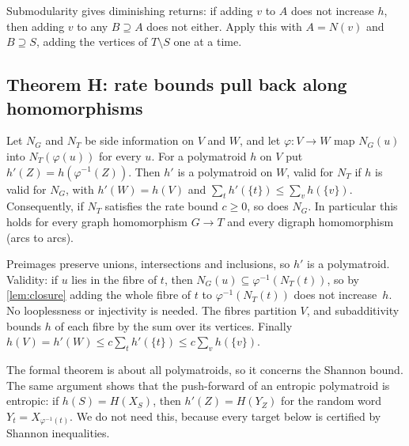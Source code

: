 \begin{outline}
Submodularity gives diminishing returns: if adding $v$ to $A$ does not increase $h$, then adding $v$ to any $B\supseteq A$
does not either. Apply this with $A=N(v)$ and $B\supseteq S$, adding the vertices of $T\setminus S$ one at a time.
\end{outline}

\subsection{Theorem H: rate bounds pull back along homomorphisms}\label{sec:thmH}

\begin{theorem}[Theorem H]\label{thm:H}
Let $N_G$ and $N_T$ be side information on $V$ and $W$, and let $\varphi\colon V\to W$ map $N_G(u)$ into $N_T(\varphi(u))$
for every $u$. For a polymatroid $h$ on $V$ put $h'(Z)=h(\varphi^{-1}(Z))$. Then $h'$ is a polymatroid on $W$, valid for
$N_T$ if $h$ is valid for $N_G$, with $h'(W)=h(V)$ and $\sum_th'(\{t\})\le\sum_vh(\{v\})$. Consequently, if $N_T$ satisfies
the rate bound $c\ge0$, so does $N_G$. In particular this holds for every graph homomorphism $G\to T$ and every digraph
homomorphism (arcs to arcs).
\end{theorem}

\begin{outline}
Preimages preserve unions, intersections and inclusions, so $h'$ is a polymatroid. Validity: if $u$ lies in the fibre of
$t$, then $N_G(u)\subseteq\varphi^{-1}(N_T(t))$, so by \cref{lem:closure} adding the whole fibre of $t$ to
$\varphi^{-1}(N_T(t))$ does not increase~$h$. No looplessness or injectivity is needed. The fibres partition $V$, and
subadditivity bounds $h$ of each fibre by the sum over its vertices. Finally
$h(V)=h'(W)\le c\sum_th'(\{t\})\le c\sum_vh(\{v\})$.
\end{outline}

The formal theorem is about all polymatroids, so it concerns the Shannon bound. The same argument shows that the
push-forward of an entropic polymatroid is entropic: if $h(S)=H(X_S)$, then $h'(Z)=H(Y_Z)$ for the random word
$Y_t=X_{\varphi^{-1}(t)}$. We do not need this, because every target below is certified by Shannon inequalities.

